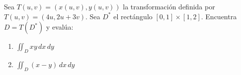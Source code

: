 Sea $T(u, v) = (x(u, v), y(u, v))$ la transformación definida por $T(u, v) = (4u, 2u+3v)$. Sea $D^*$ el rectángulo $[0,1] \times [1,2]$. Encuentra $D = T(D^*)$ y evalúa:

\begin{enumerate}[label=(\alph*), itemsep=0.4em, topsep=0.5em]
	\item $\displaystyle \iint_D xy \, dx \, dy$
	\item $\displaystyle \iint_D (x-y) \, dx \, dy$
\end{enumerate}
